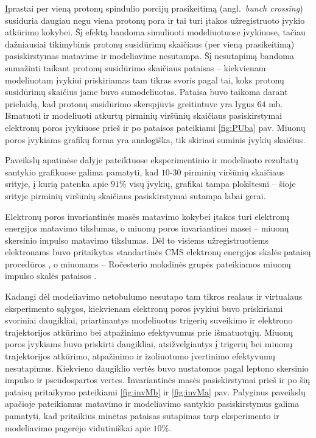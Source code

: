 \documentclass[a4paper, 12pt]{article}
\begin{document}
\vspace{-0.9cm}
\vspace{0.5cm}

Įprastai per vieną protonų spindulio porcijų prasikeitimą (angl.\ \textit{bunch crossing}) susiduria
daugiau negu viena protonų pora ir tai turi įtakos užregistruoto įvykio atkūrimo kokybei.
Šį efektą bandoma simuliuoti modeliuotuose įvykiuose, tačiau dažniausiai tikimybinis protonų susidūrimų
skaičiaus (per vieną prasikeitimą) pasiskirstymas matavime ir modeliavime nesutampa.
Šį nesutapimą bandoma sumažinti taikant protonų susidūrimo skaičiaus pataisas -- kiekvienam modeliuotam
įvykiui priskiriamas tam tikras svoris pagal tai, koks protonų susidūrimų skaičius jame buvo sumodeliuotas.
Pataisa buvo taikoma darant prielaidą, kad protonų susidūrimo skerspjūvis greitintuve yra lygus $64$ mb.
Išmatuoti ir modeliuoti atkurtų pirminių viršūnių skaičiaus pasiskirstymai elektronų poros įvykiuose
prieš ir po pataisos pateikiami \ref{fig:PUba} pav.
Miuonų poros įvykiams grafikų forma yra analogiška, tik skiriasi suminis įvykių skaičius.

Paveikslų apatinėse dalyje pateiktuose eksperimentinio ir modeliuoto rezultatų santykio grafikuose galima pamatyti, kad
$10$-$30$ pirminių viršūnių skaičiaus srityje, į kurią patenka apie $91\%$ visų įvykių, grafikai tampa plokštesni --
šioje srityje pirminių viršūnių skaičiaus pasiskirstymai sutampa labai gerai.

Elektronų poros invariantinės masės matavimo kokybei įtakos turi elektronų energijos matavimo
tikslumas, o miuonų poros invariantinei masei -- miuonų skersinio impulso matavimo tikslumas.
Dėl to visiems užregistruotiems elektronams buvo pritaikytos standartinės CMS elektronų energijos skalės
pataisų procedūros \cite{Ecorr}, o miuonams -- Ročesterio mokslinės grupės pateikiamos miuonų impulso
skalės pataisos \cite{RocCorr}.

Kadangi dėl modeliavimo netobulumo nesutapo tam tikros realaus ir virtualaus eksperimento sąlygos,
kiekvienam elektronų poros įvykiui buvo priskiriami svoriniai daugikliai, priartinantys modeliuotus trigerių
suveikimo ir elektrono trajektorijos atkūrimo bei atpažinimo efektyvumus prie išmatuotųjų.
Miuonų poros įvykiams buvo priskirti daugikliai, atsižvelgiantys į trigerių bei miuonų trajektorijos atkūrimo,
atpažinimo ir izoliuotumo įvertinimo efektyvumų nesutapimus.
Kiekvieno daugiklio vertės buvo nustatomos pagal leptono skersinio impulso ir pseudospartos vertes.
Invariantinės masės pasiskirstymai prieš ir po šių pataisų pritaikymo pateikiami \ref{fig:invMb} ir
\ref{fig:invMa} pav.
Palyginus paveikslų apačioje pateikiamus matavimo ir modeliavimo santykio pasiskirstymus galima pamatyti, kad
pritaikius minėtas pataisas sutapimas tarp eksperimento ir modeliavimo pagerėjo vidutiniškai apie $10\%$.
\end{document}
